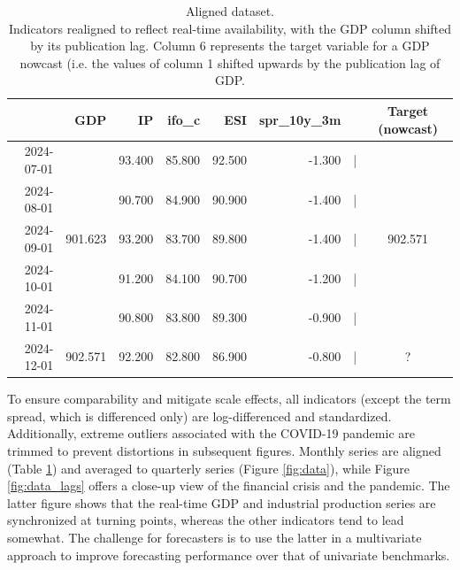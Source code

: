 \documentclass[11pt,a4paper]{article}
\begin{document}
\begin{table}[ht]
    \caption{Aligned dataset.\\
    Indicators realigned to reflect real-time availability, with the GDP column shifted by its publication lag. Column 6 represents the target variable for a GDP nowcast (i.e. the values of column 1 shifted upwards by the publication lag of GDP.} 
    \label{tab:data_stucture_aligned}
    \centering
    \begin{tabular}{rrrrrrrc}
      \hline
     & GDP & IP & ifo\_c & ESI & spr\_10y\_3m &&Target (nowcast)\\ 
      \hline
      2024-07-01 & & 93.400 & 85.800 & 92.500 & -1.300&|& \\ 
      2024-08-01 & & 90.700&  84.900 & 90.900 & -1.400&| &\\ 
      2024-09-01 & 901.623 &93.200 & 83.700 & 89.800 & -1.400&| &902.571\\ 
      2024-10-01 &  &91.200 & 84.100 & 90.700 & -1.200&| &\\ 
      2024-11-01 &  & 90.800& 83.800 & 89.300 & -0.900&| &\\ 
      2024-12-01 &902.571   & 92.200  & 82.800 & 86.900 & -0.800&| &?\\ 
        \hline
    \end{tabular}
\end{table}


To ensure comparability and mitigate scale effects, all indicators (except the term spread, which is differenced only) are log-differenced and standardized. Additionally, extreme outliers associated with the COVID-19 pandemic are trimmed to prevent distortions in subsequent figures. 
 Monthly series are aligned (Table \ref{tab:data_stucture_aligned}) and averaged to quarterly series (Figure \ref{fig:data}), while Figure \ref{fig:data_lags} offers a close-up view of the financial crisis and the pandemic. The latter figure shows that the real-time GDP and industrial production series are synchronized at turning points, whereas the other indicators tend to lead somewhat. The challenge for forecasters is to use the latter in a multivariate approach to improve forecasting performance over that of univariate benchmarks. 
\end{document}
